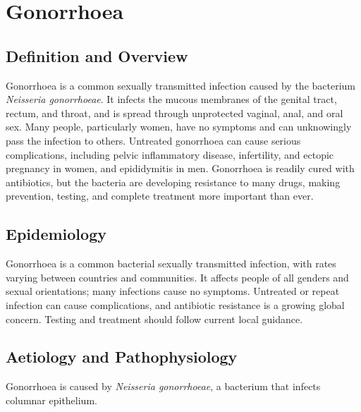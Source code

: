 \chapter{Gonorrhoea}

\section*{Definition and Overview}
Gonorrhoea is a common sexually transmitted infection caused by the bacterium \textit{Neisseria gonorrhoeae}. It infects the mucous membranes of the genital tract, rectum, and throat, and is spread through unprotected vaginal, anal, and oral sex. Many people, particularly women, have no symptoms and can unknowingly pass the infection to others. Untreated gonorrhoea can cause serious complications, including pelvic inflammatory disease, infertility, and ectopic pregnancy in women, and epididymitis in men. Gonorrhoea is readily cured with antibiotics, but the bacteria are developing resistance to many drugs, making prevention, testing, and complete treatment more important than ever.

\section*{Epidemiology}
Gonorrhoea is a common bacterial sexually transmitted infection, with rates varying between countries and communities. It affects people of all genders and sexual orientations; many infections cause no symptoms. Untreated or repeat infection can cause complications, and antibiotic resistance is a growing global concern. Testing and treatment should follow current local guidance.

\section*{Aetiology and Pathophysiology}
Gonorrhoea is caused by \textit{Neisseria gonorrhoeae}, a bacterium that infects columnar epithelium.

